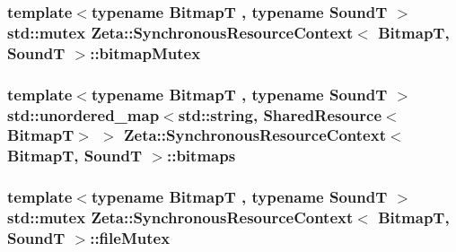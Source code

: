 \hypertarget{classZeta_1_1SynchronousResourceContext_ae7d5c99c24762905e6cc314fedb91c0c}{
\subsubsection[{bitmap\+Mutex}]{\setlength{\rightskip}{0pt plus 5cm}template$<$typename Bitmap\+T , typename Sound\+T $>$ std\+::mutex {\bf Zeta\+::\+Synchronous\+Resource\+Context}$<$ Bitmap\+T, Sound\+T $>$\+::bitmap\+Mutex\hspace{0.3cm}{\ttfamily [private]}}}\label{classZeta_1_1SynchronousResourceContext_ae7d5c99c24762905e6cc314fedb91c0c}
\hypertarget{classZeta_1_1SynchronousResourceContext_aae69d1a9031c5ed934cf32ac126e9bc8}{
\subsubsection[{bitmaps}]{\setlength{\rightskip}{0pt plus 5cm}template$<$typename Bitmap\+T , typename Sound\+T $>$ std\+::unordered\+\_\+map$<$std\+::string, {\bf Shared\+Resource}$<$Bitmap\+T$>$ $>$ {\bf Zeta\+::\+Synchronous\+Resource\+Context}$<$ Bitmap\+T, Sound\+T $>$\+::bitmaps\hspace{0.3cm}{\ttfamily [private]}}}\label{classZeta_1_1SynchronousResourceContext_aae69d1a9031c5ed934cf32ac126e9bc8}
\hypertarget{classZeta_1_1SynchronousResourceContext_ad83017d7bfd0b5c61ec19a18ef89b288}{
\subsubsection[{file\+Mutex}]{\setlength{\rightskip}{0pt plus 5cm}template$<$typename Bitmap\+T , typename Sound\+T $>$ std\+::mutex {\bf Zeta\+::\+Synchronous\+Resource\+Context}$<$ Bitmap\+T, Sound\+T $>$\+::file\+Mutex\hspace{0.3cm}{\ttfamily [private]}}}\label{classZeta_1_1SynchronousResourceContext_ad83017d7bfd0b5c61ec19a18ef89b288}
